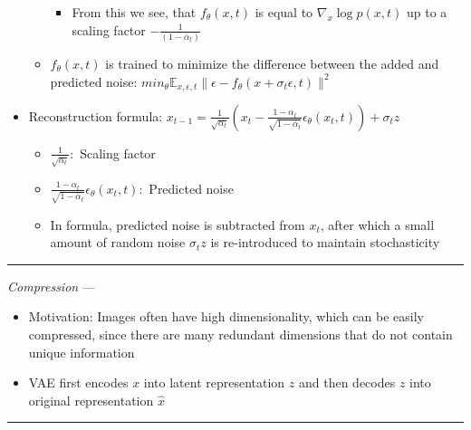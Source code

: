 \begin{itemize}
\begin{itemize}
\begin{itemize}
            \item From this we see, that $f_\theta(x,t)$ is equal to $\nabla_x \log p(x,t)$ up to a scaling factor $-\frac{1}{(1-\bar{\alpha}_t)}$
        \end{itemize}
        \item $f_\theta(x,t)$ is trained to minimize the difference between the added and predicted noise: $min_\theta \mathbb{E}_{x,\epsilon,t} \| \epsilon - f_\theta(x + \sigma_t \epsilon, t) \|^2$
    \end{itemize}
    \item Reconstruction formula: $x_{t-1} = \frac{1}{\sqrt{\alpha_t}} (x_t - \frac{1-\alpha_t}{\sqrt{1- \bar{\alpha}_t}} \epsilon_\theta(x_t,t)) + \sigma_tz$
    \begin{itemize}
        \item $\frac{1}{\sqrt{\alpha_t}}:$ Scaling factor
        \item $\frac{1-\alpha_t}{\sqrt{1- \bar{\alpha}_t}} \epsilon_\theta(x_t,t):$ Predicted noise
        \item In formula, predicted noise is subtracted from $x_t$, after which a small amount of random noise $\sigma_tz$ is re-introduced to maintain stochasticity
    \end{itemize}
\end{itemize}

{\color{lightgray}\hrule height 0.001mm}

\emph{Compression} --- 
\begin{itemize}
    \item Motivation: Images often have high dimensionality, which can be easily compressed, since there are many redundant dimensions that do not contain unique information
    \item VAE first encodes $x$ into latent representation $z$ and then decodes $z$ into original representation $\hat{x}$
\end{itemize}

{\color{lightgray}\hrule height 0.001mm}

